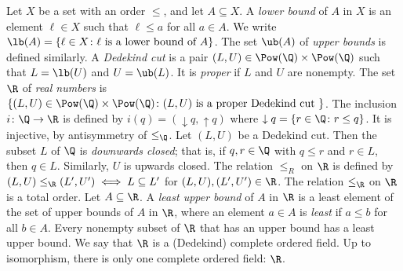  Let $X$ be a set with an order $\leq$, and let $A \subseteq X$. A \textit{lower bound} of $A$ in $X$ is an element $\ell \in X$ such that $\ell \leq a$ for all $a \in A$. We write $\lb(A) = \{ \ell \in X \colon \ell \text{ is a lower bound of } A \}$. The set $\ub(A)$ of \textit{upper bounds} is defined similarly.
 A \textit{Dedekind cut} is a pair $(L, U) \in \Pow(\Q) \times \Pow(\Q)$ such that $L = \lb(U)$ and $U = \ub(L)$. It is \textit{proper} if $L$ and $U$ are nonempty.
 The set $\R$ of \textit{real numbers} is $\{ (L, U) \in \Pow(\Q) \times \Pow(\Q) \colon (L, U) \text{ is a proper Dedekind cut } \}$. The inclusion $i \colon \Q \to \R$ is defined by $i(q) = (\downarrow q, \uparrow q)$ where $\downarrow q = \{ r \in \Q \colon r \leq q \}$. It is injective, by antisymmetry of $\leq_{\Q}$.
 Let $(L, U)$ be a Dedekind cut. Then the subset $L$ of $\Q$ is \textit{downwards closed}; that is, if $q, r \in \Q$ with $q \leq r$ and $r \in L$, then $q \in L$. Similarly, $U$ is upwards closed.
 The relation $\leq_R$ on $\R$ is defined by $(L, U) \leq_{\R} (L', U') \iff L \subseteq L'$ for $(L, U), (L', U') \in \R$.
 The relation $\leq_{\R}$ on $\R$ is a total order.
 Let $A \subseteq \R$. A \textit{least upper bound} of $A$ in $\R$ is a least element of the set of upper bounds of $A$ in $\R$, where an element $a \in A$ is \textit{least} if $a \leq b$ for all $b \in A$.
 Every nonempty subset of $\R$ that has an upper bound has a least upper bound. We say that $\R$ is a (Dedekind) complete ordered field.
 Up to isomorphism, there is only one complete ordered field: $\R$.
